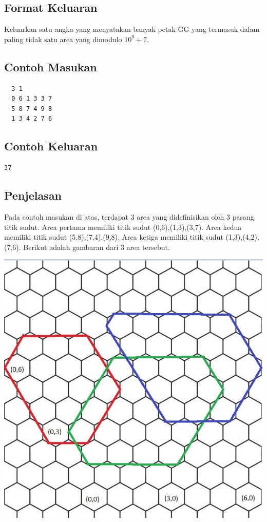\documentclass{article}
\begin{document}
\subsection*{Format Keluaran}
Keluarkan satu angka yang menyatakan banyak petak GG yang termasuk dalam paling tidak satu area yang dimodulo $10^9+7$.

\begin{multicols}{2}
\subsection*{Contoh Masukan}
\begin{lstlisting}
  3 1
  0 6 1 3 3 7
  5 8 7 4 9 8
  1 3 4 2 7 6
\end{lstlisting}
\columnbreak

\subsection*{Contoh Keluaran}
\begin{lstlisting}
37
\end{lstlisting}
\vfill
\null
\end{multicols}

\subsection*{Penjelasan}
Pada contoh masukan di atas, terdapat 3 area yang didefinisikan oleh 3 pasang titik sudut. Area pertama memiliki titik sudut (0,6),(1,3),(3,7). Area kedua memiliki titik sudut (5,8),(7,4),(9,8). Area ketiga memiliki titik sudut (1,3),(4,2),(7,6). Berikut adalah gambaran dari 3 area tersebut.

\begin{center}
    \includegraphics[scale = 0.4]{hexagon2.jpg}
\end{center}
\end{document}
